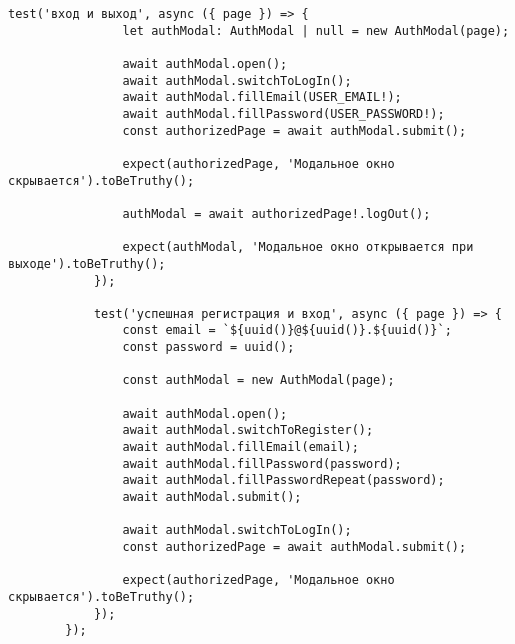 \begin{lstlisting}[caption={tests/sync-editor/auth.spec.ts}]
			test('вход и выход', async ({ page }) => {
				let authModal: AuthModal | null = new AuthModal(page);
				
				await authModal.open();
				await authModal.switchToLogIn();
				await authModal.fillEmail(USER_EMAIL!);
				await authModal.fillPassword(USER_PASSWORD!);
				const authorizedPage = await authModal.submit();
				
				expect(authorizedPage, 'Модальное окно скрывается').toBeTruthy();
				
				authModal = await authorizedPage!.logOut();
				
				expect(authModal, 'Модальное окно открывается при выходе').toBeTruthy();
			});
			
			test('успешная регистрация и вход', async ({ page }) => {        
				const email = `${uuid()}@${uuid()}.${uuid()}`;
				const password = uuid();
				
				const authModal = new AuthModal(page);
				
				await authModal.open();
				await authModal.switchToRegister();
				await authModal.fillEmail(email);
				await authModal.fillPassword(password);
				await authModal.fillPasswordRepeat(password);
				await authModal.submit();
				
				await authModal.switchToLogIn();
				const authorizedPage = await authModal.submit();
				
				expect(authorizedPage, 'Модальное окно скрывается').toBeTruthy();
			});
		});
	\end{lstlisting}

